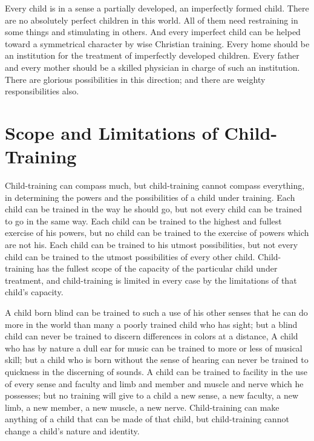 \documentclass[
]{book}
\begin{document}
Every child is in a sense a partially developed, an imperfectly formed child. There are no absolutely perfect children in this world. All of them need restraining in some things and stimulating in others. And every imperfect child can be helped toward a symmetrical character by wise Christian training. Every home should be an institution for the treatment of imperfectly developed children. Every father and every mother should be a skilled physician in charge of such an institution. There are glorious possibilities in this direction; and there are weighty responsibilities also.

\hypertarget{scope-and-limitations-of-child-training}{%
\chapter{Scope and Limitations of Child-Training}\label{scope-and-limitations-of-child-training}}

Child-training can compass much, but child-training cannot compass everything, in determining the powers and the possibilities of a child under training. Each child can be trained in the way he should go, but not every child can be trained to go in the same way. Each child can be trained to the highest and fullest exercise of his powers, but no child can be trained to the exercise of powers which are not his. Each child can be trained to his utmost possibilities, but not every child can be trained to the utmost possibilities of every other child. Child-training has the fullest scope of the capacity of the particular child under treatment, and child-training is limited in every case by the limitations of that child's capacity.

A child born blind can be trained to such a use of his other senses that he can do more in the world than many a poorly trained child who has sight; but a blind child can never be trained to discern differences in colors at a distance, A child who has by nature a dull ear for music can be trained to more or less of musical skill; but a child who is born without the sense of hearing can never be trained to quickness in the discerning of sounds. A child can be trained to facility in the use of every sense and faculty and limb and member and muscle and nerve which he possesses; but no training will give to a child a new sense, a new faculty, a new limb, a new member, a new muscle, a new nerve. Child-training can make anything of a child that can be made of that child, but child-training cannot change a child's nature and identity.
\end{document}
